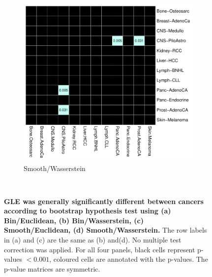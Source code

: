 \begin{figure}[ht!]
\begin{subfigure}{.55\textwidth}
    \includegraphics[scale=0.65]{graphics/bootstrap_smooth_wasserstein.pdf}
    \caption{Smooth/Wasserstein}
    \label{fig:smooth_wasserstein}
    \end{subfigure} \\
    
    \caption{\textbf{GLE was generally significantly different between cancers according to bootstrap hypothesis test using (a) Bin/Euclidean, (b) Bin/Wasserstein, (c) Smooth/Euclidean, (d) Smooth/Wasserstein.} The row labels in (a) and (c) are the same as (b) and(d). No multiple test correction was applied. For all four panels, black cells represent p-values $<0.001$, coloured cells are annotated with the p-values. The p-value matrices are symmetric.}
    \label{fig:gle_bootstrap}
\end{figure}